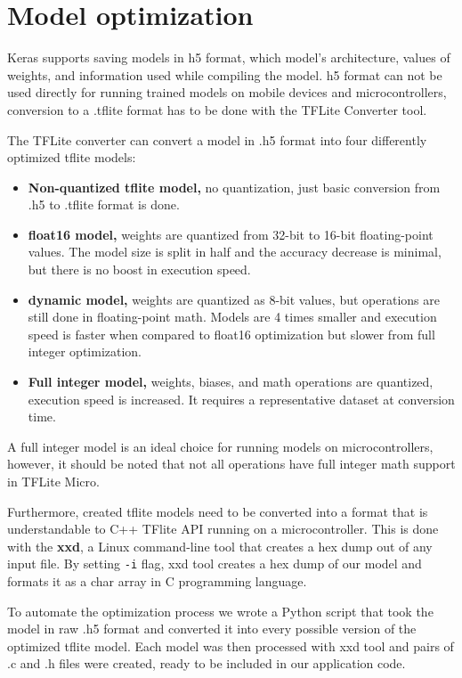 \section{ Model optimization}

Keras supports saving models in h5 format, which model's architecture, values of weights, and information used while compiling the model.
h5 format can not be used directly for running trained models on mobile devices and microcontrollers, conversion to a .tflite format has to be done with the TFLite Converter tool.

The TFLite converter can convert a model in .h5 format into four differently optimized tflite models:
\begin{itemize}
    \item \textbf{Non-quantized tflite model,} no quantization, just basic conversion from .h5 to .tflite format is done.
    \item \textbf{float16 model,} weights are quantized from 32-bit to 16-bit floating-point values. The model size is split in half and the accuracy decrease is minimal, but there is no boost in execution speed.
    \item \textbf{dynamic model,} weights are quantized as 8-bit values, but operations are still done in floating-point math. Models are 4 times smaller and execution speed is faster when compared to float16 optimization but slower from full integer optimization.
    \item \textbf{Full integer model,} weights, biases, and math operations are quantized, execution speed is increased. It requires a representative dataset at conversion time.
\end{itemize}

A full integer model is an ideal choice for running models on microcontrollers, however, it should be noted that not all operations have full integer math support in TFLite Micro.

Furthermore, created tflite models need to be converted into a format that is understandable to C++ TFlite API running on a microcontroller.
This is done with the \textbf{xxd}, a Linux command-line tool that creates a hex dump out of any input file.
By setting \verb|-i| flag,  xxd tool creates a hex dump of our model and formats it as a char array in C programming language. 

To automate the optimization process we wrote a Python script that took the model in raw .h5 format and converted it into every possible version of the optimized tflite model.
Each model was then processed with xxd tool and pairs of .c and .h files were created, ready to be included in our application code.


